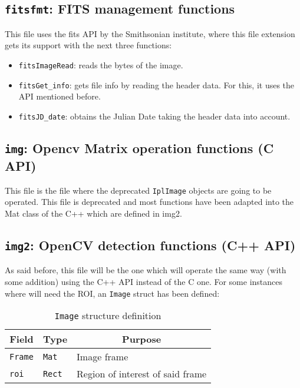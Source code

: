 \documentclass[a4paper,11pt]{memoir}
\begin{document}
\subsection{\texttt{fitsfmt}: FITS management functions}

This file uses the fits API by the Smithsonian institute, where this file extension gets its support with the next three functions:

\begin{itemize}
\item \texttt{fitsImageRead}: reads the bytes of the image.
\item \texttt{fitsGet\_info}: gets file info by reading the header data. For this, it uses the API mentioned before.
\item \texttt{fitsJD\_date}: obtains the Julian Date taking the header data into account.
\end{itemize}

\subsection{\texttt{img}: Opencv Matrix operation functions (C API)}

This file is the file where the deprecated \texttt{IplImage} objects are going to be operated. This file is deprecated and most functions have been adapted into the Mat class of the C++ which are
defined in img2.

\subsection{\texttt{img2}: OpenCV detection functions (C++ API)}
As said before, this file will be the one which will operate the same way (with some addition) using the C++ API instead of the C one. For some instances where will need the ROI, an \texttt{Image} struct has been defined:

\begin{table}[H]
\centering
\caption{\texttt{Image} structure definition}
\label{my-label}
\begin{tabular}{|m{}|m{}|m{}|}
\hline
\multicolumn{1}{|c|}{\textbf{Field}} & \multicolumn{1}{c|}{\textbf{Type}} & \multicolumn{1}{c|}{\textbf{Purpose}} \\ \hline
\texttt{Frame} & \texttt{Mat} & Image frame \\ \hline
\texttt{roi} & \texttt{Rect} & Region of interest of said frame \\ \hline
\end{tabular}
\end{table}
\end{document}
